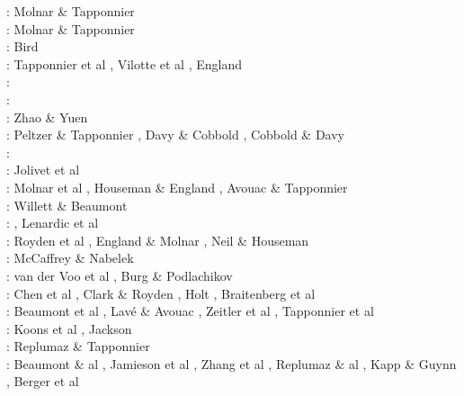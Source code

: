 \begin{itemize}
\begin{scriptsize}
\nineteenseventyfive: Molnar \& Tapponnier \cite{mota75}\\
\nineteenseventyseven:  Molnar \& Tapponnier \cite{mota77}\\
\nineteenseventyeight: Bird \cite{bird78}\\
\nineteeneightytwo: Tapponnier et al \cite{tapl82}, Vilotte et al \cite{vidm82}, England \cite{engl82}\\
\nineteeneightyfour: \cite{vidm84}\\
\nineteeneightysix: \cite{vimd86}\cite{moln86}\cite{enho86}\\
\nineteeneightyseven: Zhao \& Yuen \cite{zhyu87b} \\
\nineteeneightyeight: Peltzer \& Tapponnier \cite{peta88}, Davy \& Cobbold \cite{daco88}, 
                      Cobbold \& Davy \cite{coda88}\\
\nineteeneightynine: \cite{moln89}\\
\nineteenninety: Jolivet et al \cite{jodc90}\\
\nineteenninetythree: Molnar et al \cite{moem93}, Houseman \& England \cite{hoen93}, 
                      Avouac \& Tapponnier \cite{avta93}\\
\nineteenninetyfour: Willett \& Beaumont \cite{wibe94}\\
\nineteenninetyfive: \cite{chmm95}, Lenardic et al \cite{leka95}\\
\nineteenninetyseven: Royden et al \cite{robk97}, England \& Molnar \cite{enmo97}, 
                      Neil \& Houseman \cite{neho97}\\
\nineteenninetyeight: McCaffrey \& Nabelek \cite{mcna98}\\
\nineteenninetynine: van der Voo et al \cite{vasb99}, Burg \& Podlachikov \cite{bupo99}\\
\twothousand: Chen et al \cite{chbl00}, Clark \& Royden \cite{clro00}, Holt \cite{holt00},
              Braitenberg et al \cite{brzf00}\\
\twothousandone: Beaumont et al \cite{bejn01}, Lav{\'e} \& Avouac \cite{laav01}, Zeitler et al \cite{zemk01}, 
                 Tapponnier et al \cite{tazr01}\\
\twothousandtwo: Koons et al \cite{kozc02}, Jackson \cite{jack02}\\
\twothousandthree: Replumaz \& Tapponnier \cite{reta03}\\
\twothousandfour: Beaumont \& al \cite{bejn04}, Jamieson et al \cite{jabm04}, Zhang et al \cite{zhsw04},
                  Replumaz \& al \cite{rekv04}, Kapp \& Guynn \cite{kagu04}, Berger et al \cite{bejh04}\\

\end{scriptsize}
\end{itemize}
